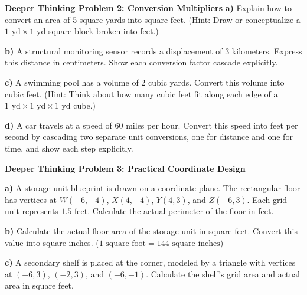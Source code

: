 \documentclass[12pt, letterpaper, fleqn]{article}
\begin{document}
\begin{tcolorbox}[colback=white, colframe=black, boxrule=1pt, arc=4mm, left=6mm, right=6mm, top=5mm, bottom=5mm]
\textbf{Deeper Thinking Problem 2: Conversion Multipliers}
\medskip
\noindent
\textbf{a)} Explain how to convert an area of 5 square yards into square feet. (Hint: Draw or conceptualize a $1\text{ yd} \times 1\text{ yd}$ square block broken into feet.)
\vspace{4cm}

\noindent
\textbf{b)} A structural monitoring sensor records a displacement of 3 kilometers. Express this distance in centimeters. Show each conversion factor cascade explicitly.
\vspace{3cm}

\noindent
\textbf{c)} A swimming pool has a volume of 2 cubic yards. Convert this volume into cubic feet. (Hint: Think about how many cubic feet fit along each edge of a $1\text{ yd} \times 1\text{ yd} \times 1\text{ yd}$ cube.)
\vspace{4cm}

\noindent
\textbf{d)} A car travels at a speed of 60 miles per hour. Convert this speed into feet per second by cascading two separate unit conversions, one for distance and one for time, and show each step explicitly.
\vspace{3cm}

\end{tcolorbox}

\begin{tcolorbox}[colback=white, colframe=black, boxrule=1pt, arc=4mm, left=6mm, right=6mm, top=5mm, bottom=5mm]
\textbf{Deeper Thinking Problem 3: Practical Coordinate Design}

\medskip
\noindent
\textbf{a)} A storage unit blueprint is drawn on a coordinate plane. The rectangular floor has vertices at $W(-6, -4)$, $X(4, -4)$, $Y(4, 3)$, and $Z(-6, 3)$. Each grid unit represents $1.5$ feet. Calculate the actual perimeter of the floor in feet.
\vspace{5cm}

\noindent
\textbf{b)} Calculate the actual floor area of the storage unit in square feet. Convert this value into square inches. ($1\text{ square foot} = 144\text{ square inches}$)
\vspace{5cm}

\noindent
\textbf{c)} A secondary shelf is placed at the corner, modeled by a triangle with vertices at $(-6, 3)$, $(-2, 3)$, and $(-6, -1)$. Calculate the shelf's grid area and actual area in square feet.
\vspace{5cm}
\end{tcolorbox}
\end{document}
